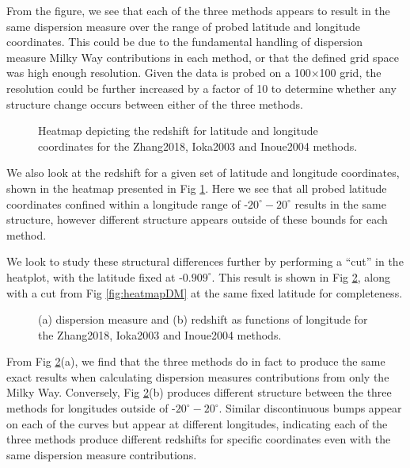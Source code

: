 \documentclass{article}
\begin{document}
From the figure, we see that each of the three methods appears to result in the same dispersion measure over the range of probed latitude and longitude coordinates. This could be due to the fundamental handling of dispersion measure Milky Way contributions in each method, or that the defined grid space was high enough resolution. Given the data is probed on a 100$\times$100 grid, the resolution could be further increased by a factor of 10 to determine whether any structure change occurs between either of the three methods.

\begin{figure}[!htb]
\centering
{}\hfill
{}\par 
{}
\caption{Heatmap depicting the redshift for latitude and longitude coordinates for the Zhang2018, Ioka2003 and Inoue2004 methods.}
\label{fig:heatplotZ}
\end{figure}

We also look at the redshift for a given set of latitude and longitude coordinates, shown in the heatmap presented in Fig \ref{fig:heatplotZ}. Here we see that all probed latitude coordinates confined within a longitude range of -$20^\circ-20^\circ$ results in the same structure, however different structure appears outside of these bounds for each method. 

We look to study these structural differences further by performing a ``cut'' in the heatplot, with the latitude fixed at -$0.909^\circ$. This result is shown in Fig \ref{fig:heatplotcut}, along with a cut from Fig \ref{fig:heatmapDM} at the same fixed latitude for completeness.

\begin{figure}[!htb]
\centering
{}\hfill
{}
\caption{ (a) dispersion measure and (b) redshift as functions of longitude for the Zhang2018, Ioka2003 and Inoue2004 methods.}
\label{fig:heatplotcut}
\end{figure}

From Fig \ref{fig:heatplotcut}(a), we find that the three methods do in fact to produce the same exact results when calculating dispersion measures contributions from only the Milky Way. Conversely, Fig \ref{fig:heatplotcut}(b) produces different structure between the three methods for longitudes outside of -$20^\circ-20^\circ$. Similar discontinuous bumps appear on each of the curves but appear at different longitudes, indicating each of the three methods produce different redshifts for specific coordinates even with the same dispersion measure contributions.
\end{document}

